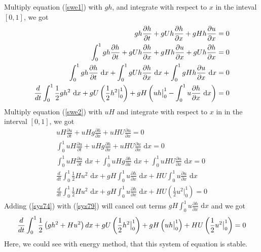 \documentclass{article}
\newcommand{\dx}{\text{ d}x}
\newcommand{\half}{\frac{1}{2}}
\theoremstyle{definition}
\begin{document}
    Multiply equation (\ref{swe1}) with $gh$, and integrate with respect to $x$ in the inteval $[0,1]$,
    we got
    \begin{align}
        gh\frac{\partial h}{\partial t}+ gUh \frac{\partial h}{\partial x}  + gHh \frac{\partial u}{\partial x} =0\\
        \int_0^1 gh\frac{\partial h}{\partial t}+ gUh \frac{\partial h}{\partial x}  + gHh \frac{\partial u}{\partial x} + gUh \frac{\partial h}{\partial x} =0\\
        \int_0^1 gh\frac{\partial h}{\partial t} \dx  +  \int_0^1 gUh  \frac{\partial h}{\partial x} \dx + \int_0^1 gHh  \frac{\partial u}{\partial x} \dx=0\\
        \frac{d}{dt} \int_0^1 \half gh^2 \dx + gU \left( \half h^2 \big\vert_0^1 \right) 
            + gH \left( uh\big{\vert}_0^1 - \int_0^1 u \frac{\partial h}{\partial x} \dx \right) =0 \label{sys74}
    \end{align}
    Multiply equation ({\ref{swe2}}) with $uH$ and integrate with respect to $x$ in in the interval $[0,1]$, we got
    \begin{align}
        uH\frac{\partial u}{\partial t} + uHg \frac{\partial h}{\partial x} + uHU \frac{\partial u}{\partial x}  =0 \\
        \int_0^1 uH\frac{\partial u}{\partial t} + uHg \frac{\partial h}{\partial x} + uHU \frac{\partial u}{\partial x} \dx  =0 \\
        \int_0^1 uH\frac{\partial u}{\partial t} \dx + \int_0^1 uHg \frac{\partial h}{\partial x} \dx +  \int_0^1 uHU \frac{\partial u}{\partial x} \dx =0 \\
        \frac{d}{dt} \int_0^1 \half Hu^2 \dx + gH \int_0^1 u \frac{\partial h }{\partial x} \dx + HU \int_0^1 u\frac{\partial u}{\partial x} \dx \\
        \frac{d}{dt} \int_0^1 \half Hu^2 \dx + gH \int_0^1 u \frac{\partial h }{\partial x} \dx + HU \left( \half u^2 \big\vert_0^1 \right)  =0 \label{sys79}
    \end{align}
    Adding (\ref{sys74}) with (\ref{sys79}) will cancel out terms $gH \int_0^1 u \frac{\partial h }{\partial x} \dx$ and we got
    \begin{align}\label{sys80}
        \frac{d}{dt} \int_0^1 \half \left(gh^2 + Hu^2 \right) dx 
            + gU \left( \half h^2 \big\vert_0^1 \right)
            + gH \left( uh\big{\vert}_0^1 \right)
            + HU \left( \half u^2 \big\vert_0^1 \right) = 0
    \end{align}
    Here, we could see with energy method, that this system of equation is stable. 
    
\end{document}
